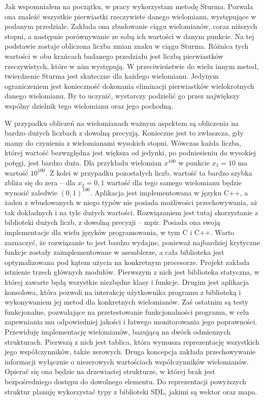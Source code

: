\documentclass[twoside,a4paper]{book}
\begin{document}
Jak wspomniałem na początku, w pracy wykorzystam metodę Sturma. Pozwala ona znaleźć wszystkie pierwiastki rzeczywiste danego wielomianu, występujące w podanym przedziale. Zakłada ona zbudowanie ciągu wielomianów, coraz niższych stopni, a następnie porównywanie ze sobą ich wartości w danym punkcie. Na tej podstawie zostaje obliczona liczba zmian znaku w ciągu Sturma. Różnica tych wartości w obu krańcach badanego przedziału jest liczbą pierwiastków rzeczywistych, które w nim występują. W przeciwieństwie do wielu innym metod, twierdzenie Sturma jest skuteczne dla każdego wielomianu. Jedynym ograniczeniem jest konieczność dokonania eliminacji pierwiastków wielokrotnych danego wielomianu. By to uczynić, wystarczy podzielić go przez największy wspólny dzielnik tego wielomianu oraz jego pochodną.

W przypadku obliczeń na wielomianach ważnym aspektem są obliczenia na bardzo dużych liczbach z dowolną precyzją. Konieczne jest to zwłaszcza, gdy mamy do czynienia z wielomianami wysokich stopni. Wówczas każda liczba, której wartość bezwzględna jest większa od jedynki, po podniesieniu do wysokiej potęgi, jest bardzo duża. Dla przykładu wielomian $x^{100}$ w punkcie $x_1=10$ ma wartość $10^{100}$. Z kolei w przypadku pozostałych liczb, wartość ta bardzo szybka zbliża się do zera – dla $x_2=0,1$ wartość dla tego samego wielomianu będzie wynosić zaledwie $(0,1)^{100}$. Aplikacja jest implementowana w języku C++, a żaden z wbudowanych w niego typów nie posiada możliwości przechowywania, aż tak dokładnych i na tyle dużych wartości. Rozwiązaniem jest tutaj skorzystanie z biblioteki dużych liczb, z dowolną precyzji – mpir. Posiada ona swoją implementacje dla wielu języków programowania, w tym C i C++.  Warto zaznaczyć, że rozwiązanie to jest bardzo wydajne, ponieważ najbardziej krytyczne funkcje zostały zaimplementowane w asemblerze, a cała biblioteka jest optymalizowana pod kątem użycia na konkretnym procesorze.
Projekt zakłada istnienie trzech głównych modułów. Pierwszym z nich jest biblioteka statyczna, w której zawarte będą wszystkie niezbędne klasy i funkcje. Drugim jest aplikacja konsolowa, która pozwoli na interakcję użytkownika programu z biblioteką i wykonywaniem jej metod dla konkretnych wielomianów. Zaś ostatnim są testy funkcjonalne, pozwalające na przetestowanie funkcjonalności programu, w celu zapewniania mu odpowiedniej jakości i łatwego monitorowania jego poprawności.
Przewiduję implementację wielomianów, bazującą na dwóch odmiennych strukturach. Pierwszą z nich jest tablica, która wymusza reprezentację wszystkich jego współczynników, także zerowych. Druga koncepcja zakłada przechowywanie informacji wyłącznie o niezerowych wartościach  współczynników wielomianów. Opierać się ona będzie na drzewiastej strukturze, w której brak jest bezpośredniego dostępu do dowolnego elementu. Do reprezentacji powyższych struktur planuję wykorzystać typy z biblioteki SDL, jakimi są wektor oraz mapa.
\end{document}
